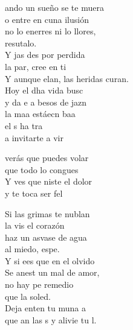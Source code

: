 \begin{cancion}%
	ando un sueño se te muera\\
	o entre en cuna ilusión\\
	no lo enerres ni lo llores, \\
	resutalo.\\
	Y jas des por perdida\\
	la par, cree en ti\\
	Y aunque elan, las heridas curan.\\
	Hoy el dha vida busc \\
	y  da e a besos de jazn\\
	la maa estáecn baa\\
	el s  ha tra \\
	a invitarte a vir\jump\\
	\begin{chorus}%
		verás que puedes volar\\
		que todo lo congues\\
		Y ves que niste el dolor\\
		y te toca ser fel \jump\\
	\end{chorus}%
	Si las grimas te nublan\\
	la vis el corazón\\
	haz un asvase de agua\\
	al miedo, espe.\\
	Y si ees que en el olvido\\
	Se anest un mal de amor,\\
	no hay pe remedio\\
	que la soled.\\
	Deja enten tu muna a\\
	que an las s y alivie tu l.\\

\end{cancion}
